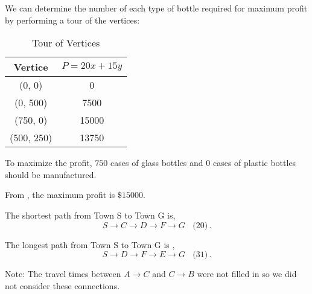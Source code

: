 \begin{subquestions}
\begin{subsubquestions}
\begin{subsubsubquestions}
\subsubsubquestion

We can determine the number of each type of bottle required for maximum profit by performing a tour of the vertices:
\begin{table}[H]
	\centering
	\begin{tabular}{|c|c|}
		\hline
		Vertice & $P = 20x + 15y$ \\
		\hline
		(0, 0) & 0 \\
		(0, 500) & 7500 \\
		(750, 0) & 15000 \\
		(500, 250) & 13750 \\
		\hline
	\end{tabular}
	\caption{\label{2015:q1:tab:Profit} Tour of Vertices}
\end{table}


To maximize the profit, $750$ cases of glass bottles and $0$ cases of plastic bottles should be manufactured.


\subsubsubquestion

From , the maximum profit is $\$ 15000$.

\end{subsubsubquestions}

\end{subsubquestions}


\subquestion

The shortest path from Town S to Town G is,
\begin{equation}
	S \rightarrow C \rightarrow D \rightarrow F \rightarrow G ~~~~\text{(20)} \,.
\end{equation}

The longest path from Town S to Town G is ,
\begin{equation}
	S \rightarrow D \rightarrow F \rightarrow E \rightarrow G ~~~~\text{(31)} \,.
\end{equation}

Note: The travel times between $A \rightarrow C$ and $C \rightarrow B$ were not filled in so we did not consider these connections.

\end{subquestions}

